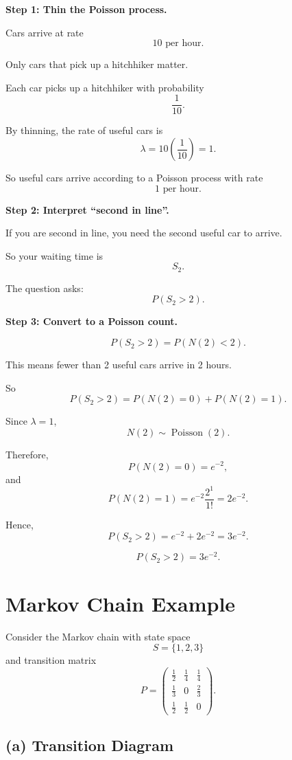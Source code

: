 \documentclass[12pt]{article}
\begin{document}
\textbf{Step 1: Thin the Poisson process.}

Cars arrive at rate
\[
10 \text{ per hour}.
\]

Only cars that pick up a hitchhiker matter.

Each car picks up a hitchhiker with probability
\[
\frac{1}{10}.
\]

By thinning, the rate of useful cars is
\[
\lambda=10\left(\frac{1}{10}\right)=1.
\]

So useful cars arrive according to a Poisson process with rate
\[
1 \text{ per hour}.
\]

\textbf{Step 2: Interpret ``second in line''.}

If you are second in line, you need the second useful car to arrive.

So your waiting time is
\[
S_2.
\]

The question asks:
\[
P(S_2>2).
\]

\textbf{Step 3: Convert to a Poisson count.}

\[
P(S_2>2)=P(N(2)<2).
\]

This means fewer than 2 useful cars arrive in 2 hours.

So
\[
P(S_2>2)=P(N(2)=0)+P(N(2)=1).
\]

Since \(\lambda=1\),
\[
N(2)\sim \operatorname{Poisson}(2).
\]

Therefore,
\[
P(N(2)=0)=e^{-2},
\]
and
\[
P(N(2)=1)=e^{-2}\frac{2^1}{1!}=2e^{-2}.
\]

Hence,
\[
P(S_2>2)=e^{-2}+2e^{-2}=3e^{-2}.
\]

\[
\boxed{P(S_2>2)=3e^{-2}.}
\]

\section{Markov Chain Example}

Consider the Markov chain with state space
\[
S=\{1,2,3\}
\]
and transition matrix
\[
P=
\begin{pmatrix}
\frac12 & \frac14 & \frac14\\
\frac13 & 0 & \frac23\\
\frac12 & \frac12 & 0
\end{pmatrix}.
\]

\subsection*{(a) Transition Diagram}
\end{document}
